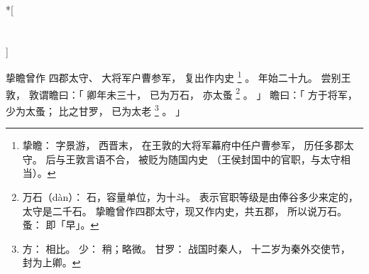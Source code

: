 
\pagebreak
\switchcolumn[0]*[\section{}]

挚瞻曾作
四郡太守、
大将军户曹参军，
复出作内史%
\footnote{%
    挚瞻：
        字景游，
        西晋末，
        在王敦的大将军幕府中任户曹参军，
        历任多郡太守。
        后与王敦言语不合，
        被贬为随国内史
        （王侯封国中的官职，与太守相当）。
}%
。
年始二十九。
尝别王敦，
敦谓瞻曰：「
    卿年未三十，
    已为万石，
    亦太蚤%
    \footnote{%
        万石（dàn）：
            石，容量单位，为十斗。
            表示官职等级是由俸谷多少来定的，
            太守是二千石。
            挚瞻曾作四郡太守，现又作内史，共五郡，
            所以说万石。
        蚤：
            即「早」。
    }%
    。
」
瞻曰：「
    方于将军，
    少为太蚤；
    比之甘罗，
    已为太老%
    \footnote{%
        方：
            相比。
        少：
            稍；略微。
        甘罗：
            战国时秦人，
            十二岁为秦外交使节，
            封为上卿。
    }%
    。
」

\switchcolumn


